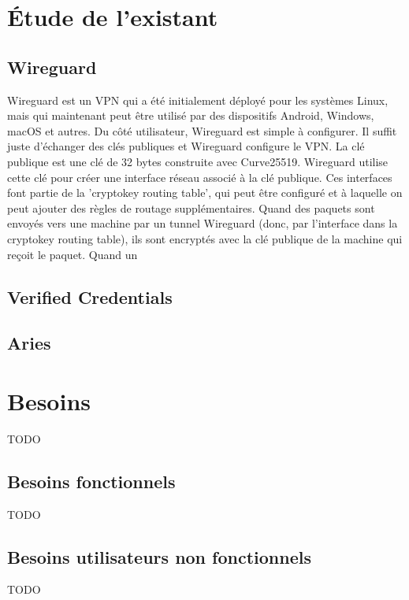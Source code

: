\documentclass[12pt, openany]{report}
\begin{document}
\section{Étude de l'existant}
\noindent 
\begin{flushleft}
\subsection{Wireguard}
Wireguard est un VPN qui a été initialement déployé pour les systèmes Linux, mais qui maintenant peut être utilisé par des dispositifs Android, Windows, macOS et autres. Du côté utilisateur, Wireguard est simple à configurer. Il  suffit juste d'échanger des clés publiques et Wireguard configure le VPN. La clé publique est une clé de 32 bytes construite avec Curve25519. Wireguard utilise cette clé pour créer une interface réseau associé à la clé publique. Ces interfaces font partie de la 'cryptokey routing table', qui peut être configuré et à laquelle on peut ajouter des règles de routage supplémentaires. Quand des paquets sont envoyés vers une machine par un tunnel Wireguard (donc, par l'interface dans la cryptokey routing table), ils sont encryptés avec la clé publique de la machine qui reçoit le paquet.
Quand un 

\subsection{Verified Credentials}

\subsection{Aries }

\end{flushleft}

\section{Besoins}
\noindent 
\begin{flushleft}
TODO
\end{flushleft}
\subsection{Besoins fonctionnels}
\noindent 
\begin{flushleft}
TODO
\end{flushleft}
\subsection{Besoins utilisateurs non fonctionnels}
\noindent 
\begin{flushleft}
TODO
\end{flushleft}
\end{document}
